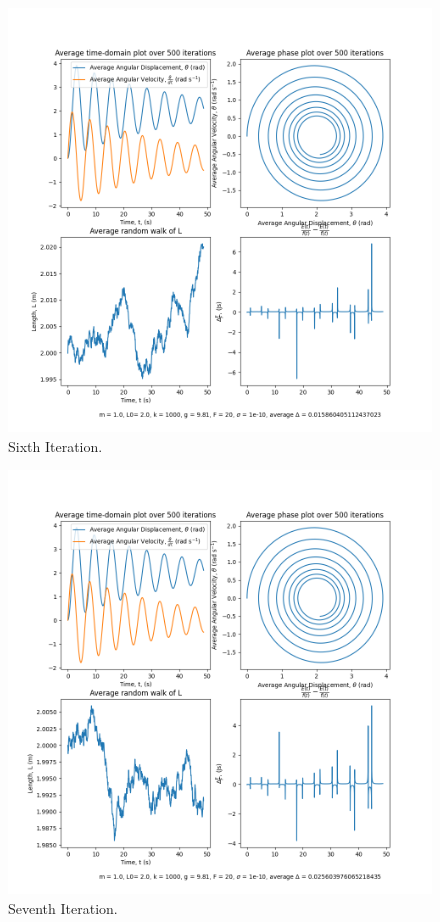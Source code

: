 \documentclass[10pt, twocolumn]{article}
\begin{document}
\begin{figure}
    \centering
    \includegraphics[width = \columnwidth]{Projects/ForcedSimplePendulum/Plots/m = 1.0, L0= 2.0, k = 1000, g = 9.81, F = 20, sigma = 1e-10, run number 5.png}
    \caption{Sixth Iteration.}
    \label{fig:enter-label}
\end{figure}

\begin{figure}
    \centering
    \includegraphics[width = \columnwidth]{Projects/ForcedSimplePendulum/Plots/m = 1.0, L0= 2.0, k = 1000, g = 9.81, F = 20, sigma = 1e-10, run number 6.png}
    \caption{Seventh Iteration.}
    \label{fig:enter-label}
\end{figure}
\end{document}
